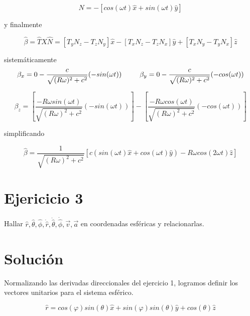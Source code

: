 \documentclass[12 pt]{article}
\begin{document}
\begin{equation*}
\hat{N}= -[cos(\omega t) \hat{x}+ sin(\omega t) \hat{y}]
\end{equation*}

y finalmente 

\begin{equation*}
\hat{\beta} = \hat{T} X \hat{N} = [T_{y}N_{z}-T_{z}N_{y}]\hat{x} - [T_{x}N_{z}-T_{z}N_{x}] \hat{y}+[T_{x}N_{y}-T_{y}N_{x}]\hat{z}
\end{equation*}

sistemáticamente
\begin{equation*}
\beta_{x} = 0- \frac{c}{\sqrt{(R\omega)^{2} + c^{2}}}(-sin(\omega t)) \hspace{0.9cm}
\beta_{y}=  0- \frac{c}{\sqrt{(R\omega)^{2} + c^{2}}}(-cos(\omega t)) 
\end{equation*}

\begin{equation*}
\beta_{z}= \left[\frac{-R\omega sin(\omega t)}{\sqrt{(R\omega)^{2} + c^{2}}} (-sin(\omega t)) \right]-\left[\frac{-R\omega cos(\omega t)}{\sqrt{(R\omega)^{2} + c^{2}}}(-cos(\omega t))\right]
\end{equation*}

simplificando 

\begin{equation*}
\hat{\beta}= \frac{1}{\sqrt{(R\omega)^{2} + c^{2}}} \left[ c (sin(\omega t) \hat{x} + cos(\omega t )\hat{y}) -R\omega cos (2\omega t) \hat{z} \right]
\end{equation*}

\section*{Ejericicio 3} 
Hallar $\hat{r},\hat{\theta}, \hat{\phi}, \dot{\hat{r}}, \dot{\hat{\theta}}, \dot{\hat{\phi}}, \vec{v}, \vec{a}$ en coordenadas esféricas y relacionarlas.

\section*{Solución}

Normalizando las derivadas direccionales del ejercicio 1, logramos definir los vectores unitarios para el sistema esférico.

\begin{equation*}
\hat{r}= cos(\varphi) sin (\theta) \hat{x} + 	sin (\varphi) sin(\theta) \hat{y} + cos(\theta)\hat{z}
\end{equation*}
\end{document}
